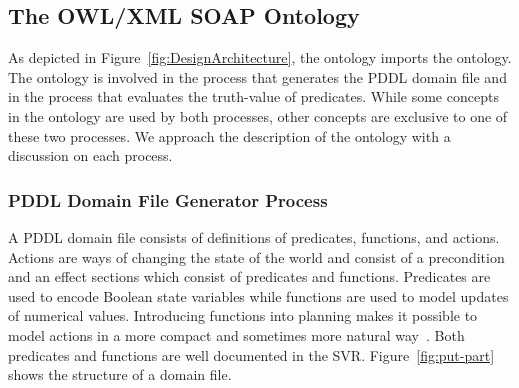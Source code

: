 \subsection{The OWL/XML SOAP Ontology}\label{owlsoap}
As depicted in Figure~\ref{fig:DesignArchitecture}, the  ontology imports the  ontology. The  ontology is involved in the process that generates the PDDL domain file and in the process that evaluates the truth-value of predicates. While some concepts in the  ontology are used by both processes, other concepts are exclusive to one of these two processes. We approach the description of the  ontology with a discussion on each process.

\subsubsection{PDDL Domain File Generator Process}\label{sss:domainfile}
A PDDL domain file consists of definitions of predicates, functions, and actions. Actions are ways of changing the state of the world and consist of a precondition and an effect sections which consist of predicates and functions. Predicates are used to encode Boolean state variables while functions are used to model updates of numerical values. Introducing functions into planning makes it possible to model actions in a more compact and sometimes more natural way~\cite{FOX.JAIR.2003}. Both predicates and functions are well documented in the SVR. Figure~\ref{fig:put-part} shows the structure of a domain file.

